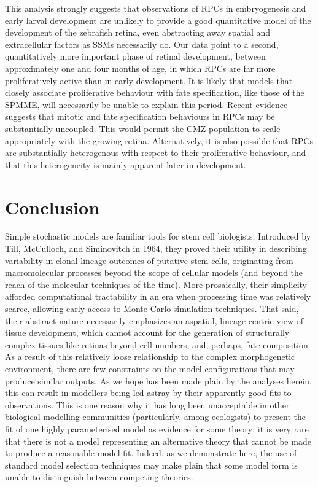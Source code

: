 \documentclass[10pt,letterpaper]{article}
\begin{document}
This analysis strongly suggests that observations of RPCs in embryogenesis and early larval development are unlikely to provide a good quantitative model of the development of the zebrafish retina, even abstracting away spatial and extracellular factors as SSMs necessarily do. Our data point to a second, quantitatively more important phase of retinal development, between approximately one and four months of age, in which RPCs are far more proliferatively active than in early development. It is likely that models that closely associate proliferative behaviour with fate specification, like those of the SPMME, will necessarily be unable to explain this period. Recent evidence suggests that mitotic and fate specification behaviours in RPCs may be substantially uncoupled\cite{Engerer2017}. This would permit the CMZ population to scale appropriately with the growing retina. Alternatively, it is also possible that RPCs are substantially heterogenous with respect to their proliferative behaviour, and that this heterogeneity is mainly apparent later in development.

\section*{Conclusion}

Simple stochastic models are familiar tools for stem cell biologists. Introduced by Till, McCulloch, and Siminovitch in 1964, they proved their utility in describing variability in clonal lineage outcomes of putative stem cells, originating from macromolecular processes beyond the scope of cellular models (and beyond the reach of the molecular techniques of the time). More prosaically, their simplicity afforded computational tractability in an era when processing time was relatively scarce, allowing early access to Monte Carlo simulation techniques. That said, their abstract nature necessarily emphasizes an aspatial, lineage-centric view of tissue development, which cannot account for the generation of structurally complex tissues like retinas beyond cell numbers, and, perhaps, fate composition. As a result of this relatively loose relationship to the complex morphogenetic environment, there are few constraints on the model configurations that may produce similar outputs. As we hope has been made plain by the analyses herein, this can result in modellers being led astray by their apparently good fits to observations. This is one reason why it has long been unacceptable in other biological modelling communities (particularly, among ecologists) to present the fit of one highly parameterised model as evidence for some theory; it is very rare that there is not a model representing an alternative theory that cannot be made to produce a reasonable model fit. Indeed, as we demonstrate here, the use of standard model selection techniques may make plain that some model form is unable to distinguish between competing theories.
\end{document}
